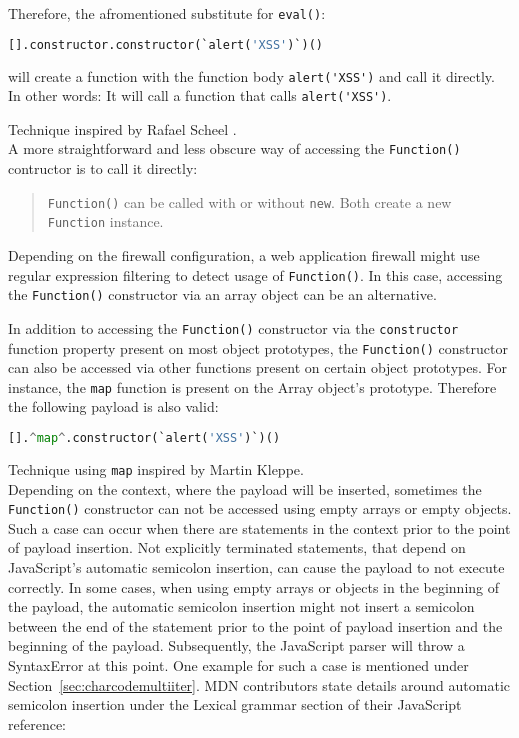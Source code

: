 Therefore, the afromentioned substitute for \verb|eval()|:

\begin{lstlisting}[style=basicStyle,language=Python]
[].constructor.constructor(`alert('XSS')`)()
\end{lstlisting}
will create a function with the function body \verb|alert('XSS')| and call it directly.
In other words: It will call a function that calls \verb|alert('XSS')|.

Technique inspired by Rafael Scheel \cite{onecons/wafbypass}. \\

A more straightforward and less obscure way of accessing the \verb|Function()| contructor is to call it directly:
\begin{quote}
	\verb|Function()| can be called with or without \verb|new|. Both create a new \verb|Function| instance. \cite{js/function}
\end{quote}
Depending on the firewall configuration, a web application firewall might use regular expression filtering to detect usage of \verb|Function()|.
In this case, accessing the \verb|Function()| constructor via an array object can be an alternative.

In addition to accessing the \verb|Function()| constructor via the \verb|constructor| function property present on most object prototypes, the \verb|Function()| constructor can also be accessed via other functions present on certain object prototypes. For instance, the \verb|map| function is present on the Array object's prototype. Therefore the following payload is also valid:

\begin{lstlisting}[style=basicStyle,language=Python,escapeinside=\^\^]
[].^map^.constructor(`alert('XSS')`)()
\end{lstlisting}
Technique using \verb|map| inspired by Martin Kleppe. \cite{mk/elementsVid} \\

Depending on the context, where the payload will be inserted, sometimes the \verb|Function()| constructor can not be accessed using empty arrays or empty objects. Such a case can occur when there are statements in the context prior to the point of payload insertion. Not explicitly terminated statements, that depend on JavaScript's automatic semicolon insertion, can cause the payload to not execute correctly. In some cases, when using empty arrays or objects in the beginning of the payload, the automatic semicolon insertion might not insert a semicolon between the end of the statement prior to the point of payload insertion and the beginning of the payload. Subsequently, the JavaScript parser will throw a SyntaxError at this point. One example for such a case is mentioned under Section~\ref{sec:charcodemultiiter}. MDN contributors state details around automatic semicolon insertion under the Lexical grammar section of their JavaScript reference: \cite{js/autosemi}

